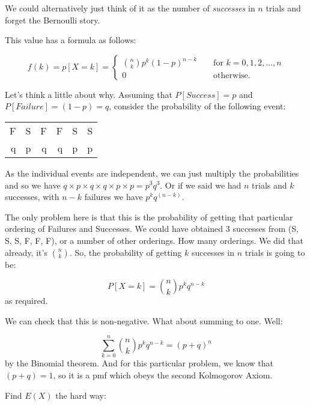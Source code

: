 \documentclass[12pt]{extbook}
\begin{document}
We could alternatively just think of it as the number of \emph{successes} in $n$ trials and forget the Bernoulli story.

This value has a formula as follows:

\begin{displaymath}
f(k) = p[X=k] = \left\{  \begin{array}{crr}  {n \choose k} p^k (1-p)^{n-k} & &  \mbox{ for }
k=0,1,2,\ldots,n \\
0 & & \mbox{ otherwise.} \end{array} \right.
\end{displaymath}


Let's think a little about why.   Assuming that $P[Success]=p$ and $P[Failure] = (1-p) = q$, consider the probability of the following event:

\begin{tabular}{rrrrrr}
F & S & F & F & S & S \\
q & p & q & q & p & p \\
\end{tabular}

As the individual events are independent, we can just multiply the probabilities and so we have $q \times p \times q \times q \times p \times p = p^3q^3$.   Or if we said we had $n$ trials and $k$ successes, with $n-k$ failures we have $p^k  q^{(n-k)}$.

The only problem here is that this is the probability of getting that particular ordering of Failures and Successes.   We could have obtained 3 successes from (S, S, S, F, F, F), or a number of other orderings.   How many orderings.   We did that already, it's $\binom{n}{k}$.   So, the probability of getting $k$ successes in $n$ trials is going to be:

\begin{displaymath}
P[X=k] = \binom{n}{k}p^k q^{n-k}
\end{displaymath}
as required.



We can check that this is non-negative.   What about summing to one.   Well:

\begin{displaymath}
\sum_{k=0}^n \binom{n}{k} p^k q^{n-k} = (p+q)^n
\end{displaymath}
by the Binomial theorem.  And for this particular problem, we know that $(p+q)=1$, so it is a pmf which obeys the second Kolmogorov Axiom.


Find $E(X)$ the hard way:
\end{document}
